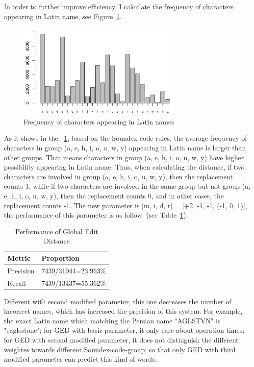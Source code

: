 \documentclass[11pt]{article}
\begin{document}
\setlength{\parskip}{0.5\baselineskip}

In order to further improve efficiency, I calculate the frequency of characters appearing in Latin name, see Figure~\ref{fig}.
\begin{figure}[htbp] 
\centering
\includegraphics[width=3.2in]{frequencyinLatin} 
\caption{Frequency of characters appearing in Latin names}\label{fig} 
\end{figure} 
\par
As it shows in the ~\ref{fig}, based on the Soundex code rules, the average frequency of characters in group (a, e, h, i, o, u, w, y) appearing in Latin name is larger than other groups. That means characters in group (a, e, h, i, o, u, w, y) have higher possibility appearing in Latin name. Thus, when calculating the distance, if two characters are involved in group (a, e, h, i, o, u, w, y), then the replacement counts 1, while if two characters are involved in the same group but not group (a, e, h, i, o, u, w, y), then the replacement counts 0, and in other cases, the replacement counts -1. The new parameter is [m, i, d, r] = [+2, -1, -1, (-1, 0, 1)], the performance of this parameter is as follow: (see Table~\ref{table3}).

\begin{table}[h]
 \begin{center}
\begin{tabular}{|l|l|}

      \hline
      Metric & Proportion\\
      \hline\hline
      Precision & 7439/31044=23.963\%\\
      Recall & 7439/13437=55.362\%\\
      \hline

\end{tabular}
\caption{Performance of Global Edit Distance}\label{table3}
\end{center}
\end{table}

Different with second modified parameter, this one decreases the number of incorrect names, which has increased the precision of this system. For example, the exact Latin name which matching the Persian name "AGLSTVN" is "eaglestone"; for GED with basic parameter, it only care about operation times; for GED with second modified parameter, it does not distinguish the different weightes towards different Soundex-code-group; so that only GED with third modified parameter can predict this kind of words.
\end{document}
